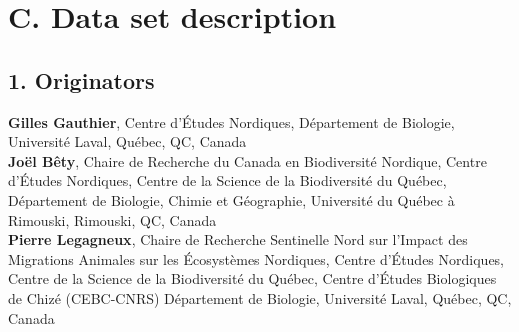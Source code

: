 \documentclass[a4paper,twoside,12pt]{article}
\begin{document}
    \section*{C. Data set description}
                \subsection*{1. Originators}
                \textbf{Gilles Gauthier}, Centre d’Études Nordiques, Département de Biologie, Université Laval, Québec, QC, Canada\\
                \textbf{Joël Bêty},  Chaire de Recherche du Canada en Biodiversité Nordique, Centre d’Études Nordiques, Centre de la Science de la Biodiversité du Québec, Département de Biologie, Chimie et Géographie, Université du Québec à Rimouski, Rimouski, QC, Canada \\
                \textbf{Pierre Legagneux}, Chaire de Recherche Sentinelle Nord sur l’Impact des Migrations Animales sur les Écosystèmes Nordiques, Centre d’Études Nordiques, Centre de la Science de la Biodiversité du Québec, Centre d’Études Biologiques de Chizé (CEBC-CNRS) Département de Biologie, Université Laval, Québec, QC, Canada
                
\end{document}
